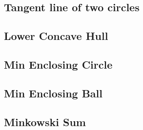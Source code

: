 \documentclass[a4paper,10pt,twocolumn,oneside]{article}
\begin{document}
\subsection{Tangent line of two circles}


%
%

%

\subsection{Lower Concave Hull}


% 

\subsection{Min Enclosing Circle}


\subsection{Min Enclosing Ball}


%

\subsection{Minkowski Sum}


% 
\end{document}
